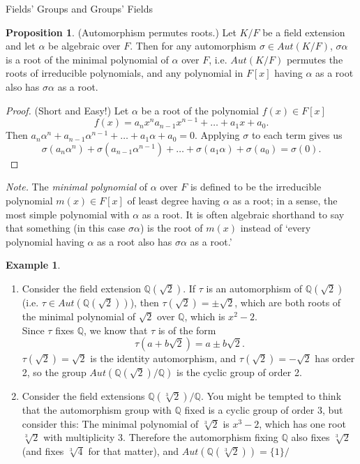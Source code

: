 \documentclass[12pt]{article}
\theoremstyle{definition}
\theoremstyle{definition}
\newtheorem{example}{Example}[section]
\theoremstyle{definition}
\theoremstyle{definition}
\theoremstyle{definition}
\newtheorem{proposition}{Proposition}[section]
\theoremstyle{definition}
\begin{document}
\begin{section}{Fields' Groups and Groups' Fields}
    \begin{proposition}{(Automorphism permutes roots.)}
        Let \(K/F\) be a field extension and let \(\alpha\) be algebraic over \(F\). Then for any automorphism \(\sigma \in Aut(K/F)\), \(\sigma\alpha\) is a root 
        of the minimal polynomial of \(\alpha\) over \(F\), i.e. \(Aut(K/F)\) permutes the roots of irreducible polynomials, and any polynomial in \(F[x]\) having 
        \(\alpha\) as a root also has \(\sigma \alpha\) as a root.
        \begin{proof}{(Short and Easy!)}
            Let \(\alpha\) be a root of the polynomial \(f(x)\in F[x]\)
            \[f(x) = a_n x^n a_{n-1} x^{n-1} + \ldots + a_1 x + a_0.\]
            Then \(a_n \alpha^n + a_{n-1} \alpha^{n-1} + \ldots + a_1 \alpha + a_0=0.\) Applying \(\sigma\) to each term gives us 
            \[\sigma(a_n \alpha^n) + \sigma(a_{n-1} \alpha^{n-1}) + \ldots + \sigma(a_1 \alpha) + \sigma(a_0) = \sigma(0).\]
        \end{proof}
        \noindent\textit{Note.} The \textit{minimal polynomial} of \(\alpha\) over \(F\) is defined to be the irreducible polynomial \(m(x)\in F[x]\) of least degree
        having \(\alpha\) as a root; in a sense, the most simple polynomial with \(\alpha\) as a root. It is often algebraic shorthand to say that something (in this case \(\sigma\alpha\))
        is the root of \(m(x)\) instead of `every polynomial having \(\alpha\) as a root also has \(\sigma\alpha\) as a root.'
    \end{proposition}

    \begin{example}
        \begin{enumerate}
            \item Consider the field extension \(\mathbb{Q}(\sqrt{2})\). If \(\tau\) is an automorphism of \(\mathbb{Q}(\sqrt{2})\) (i.e. \(\tau\in Aut(\mathbb{Q}(\sqrt{2}))\)),
            then \(\tau(\sqrt{2}) = \pm \sqrt{2}\), which are both roots of the minimal polynomial of \(\sqrt{2}\) over \(\mathbb{Q}\), which is \(x^2-2\).\\
            Since \(\tau\) fixes \(\mathbb{Q}\), we know that \(\tau\) is of the form
            \[\tau(a+b\sqrt{2}) = a\pm b\sqrt{2}.\]
            \(\tau(\sqrt{2}) = \sqrt{2}\) is the identity automorphism, and  \(\tau(\sqrt{2}) = -\sqrt{2}\) has order 2, so the group \(Aut(\mathbb{Q}(\sqrt{2})/\mathbb{Q})\)
            is the cyclic group of order 2.

            \item Consider the field extensions \(\mathbb{Q}(\sqrt[3]{2})/\mathbb{Q}\). You might be tempted to think that the automorphism group with \(\mathbb{Q}\) fixed is a cyclic group of order 3, but consider this:
            The minimal polynomial of \(\sqrt[3]{2}\) is \(x^3-2\), which has one root \(\sqrt[3]{2}\) with multiplicity 3. Therefore the automorphism fixing \(\mathbb{Q}\) also fixes \(\sqrt[3]{2}\) (and fixes 
            \(\sqrt[3]{4}\) for that matter), and \(Aut(\mathbb{Q}(\sqrt[3]{2})) = \{1\}/\)
        \end{enumerate}
    \end{example}


\end{section}
\end{document}
